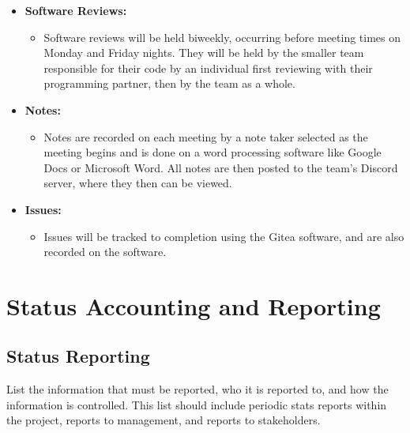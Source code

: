 \documentclass[letterpaper,12pt,oneside,listof=totoc]{scrreprt}
\begin{document}
\begin{itemize}
    \item \textbf{Software Reviews:}
    \begin{itemize}
        \item Software reviews will be held biweekly, occurring before meeting times on Monday and Friday nights. They will be held by the smaller team responsible for their code by an individual first reviewing with their programming partner, then by the team as a whole.
    \end{itemize}
    \item \textbf{Notes:}
    \begin{itemize}
        \item Notes are recorded on each meeting by a note taker selected as the meeting begins and is done on a word processing software like Google Docs or Microsoft Word. All notes are then posted to the team's Discord server, where they then can be viewed.
    \end{itemize}
    \item \textbf{Issues:}
    \begin{itemize}
        \item Issues will be tracked to completion using the Gitea software, and are also recorded on the software.
    \end{itemize}
\end{itemize}

\section{Status Accounting and Reporting}

\subsection{Status Reporting}

List the information that must be reported, who it is reported to, and how the information is controlled. This list should include periodic stats reports within the project, reports to management, and reports to stakeholders.
\end{document}

